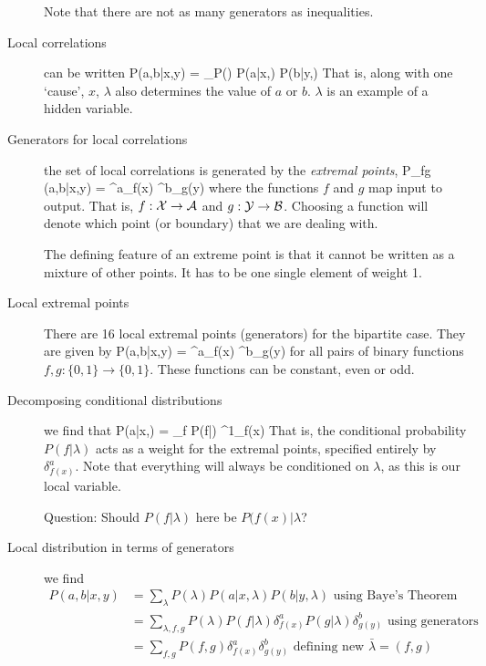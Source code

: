\begin{description}
Note that there are not as many generators as inequalities. 

\item[Local correlations] can be written
\beq
P(a,b|x,y) = \sum_\lambda P(\lambda) P(a|x,\lambda) P(b|y,\lambda)
\eeq
That is, along with one `cause', $x$, $\lambda$ also determines the value of $a$ or $b$. $\lambda$ is an example of a hidden variable. 

\item[Generators for local correlations] the set of local correlations is generated by the \emph{extremal points}, 
\beq
P_{fg} (a,b|x,y) = \delta^a_{f(x)} \delta^b_{g(y)}
\eeq
where the functions $f$ and $g$ map input to output. That is, $f:\cal{X} \rightarrow \cal{A}$ and $g: \cal{Y} \rightarrow \cal{B}$. Choosing a function will denote which point (or boundary) that we are dealing with. 

The defining feature of an extreme point is that it cannot be written as a mixture of other points. It has to be one single element of weight 1. 

\item[Local extremal points] There are 16 local extremal points (generators) for the bipartite case. They are given by 
\beq
P(a,b|x,y) = \delta^a_{f(x)} \delta^b_{g(y)}
\eeq
for all pairs of  binary functions $f,g: \{0,1\} \rightarrow \{0,1\}$. These functions can be constant, even or odd. 

\item[Decomposing conditional distributions] we find that
\beq
P(a|x,\lambda) = \sum_f P(f|\lambda) \delta^1_{f(x)}
\eeq
That is, the conditional probability $P(f|\lambda)$ acts as a weight for the extremal points, specified entirely by $\delta^a_{f(x)}$. Note that everything will always be conditioned on $\lambda$, as this is our local variable. 

Question: Should $P(f|\lambda)$ here be $P(f(x)|\lambda$? 

\item[Local distribution in terms of generators] we find
\begin{align}
P(a,b|x,y) &= \sum_\lambda P(\lambda) P(a|x,\lambda) P(b|y, \lambda) \mbox{     using Baye's Theorem} \nonumber \\
&= \sum_{\lambda, f, g} P(\lambda) P(f|\lambda) \delta^a_{f(x)} P(g|\lambda) \delta^b_{g(y)} \mbox{     using generators} \nonumber \\
&=\sum_{f,g} P(f,g) \delta^a_{f(x)} \delta^b_{g(y)}  \mbox{     defining new }\bar{\lambda} = (f,g)
\end{align}


\end{description}
